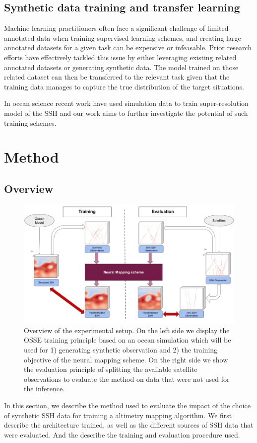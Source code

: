\documentclass[draft]{agujournal2019}
\begin{document}
\subsection{Synthetic data training and transfer learning}
\label{ssec:transferlearning}
Machine learning practitioners often face a significant challenge of limited annotated data when training supervised learning schemes, and creating large annotated datasets for a given task can be expensive or infeasable.
Prior research efforts have effectively tackled this issue by either leveraging existing related annotated datasets \cite{dengImageNetLargescaleHierarchical2009} or generating synthetic data\cite{gomezgonzalezVIPVortexImage2017,dosovitskiyFlowNetLearningOptical2015}.
The model trained on those related dataset can then be transferred to the relevant task given that the training data manages to capture the true distribution of the target situations.

In ocean science recent work have used simulation data to train super-resolution model of the SSH \cite{buongiornonardelliSuperResolvingOceanDynamics2022} and our work aims to further investigate the potential of such training schemes. 


\section{Method}
\label{sec:method}
%
\subsection{Overview}
\label{ssec:overview}
\begin{figure}[ht]
    \centering
    \includegraphics[width=\textwidth]{figures/schema_method.png}
    \caption{Overview of the experimental setup. On the left side we display the OSSE training principle based on an ocean simulation which will be used for 1) generating synthetic observation and 2) the training objective of the neural mapping scheme. On the right side we show the evaluation principle of splitting the available satellite observations to evaluate the method on data that were not used for the inference.}
    \label{fig:method}
\end{figure}
In this section, we describe the method used to evaluate the impact of the choice of synthetic SSH data for training a altimetry mapping algorithm. We first describe the architecture trained, as well as the different sources of SSH data that were evaluated. And the describe the training and evaluation procedure used.
\end{document}
